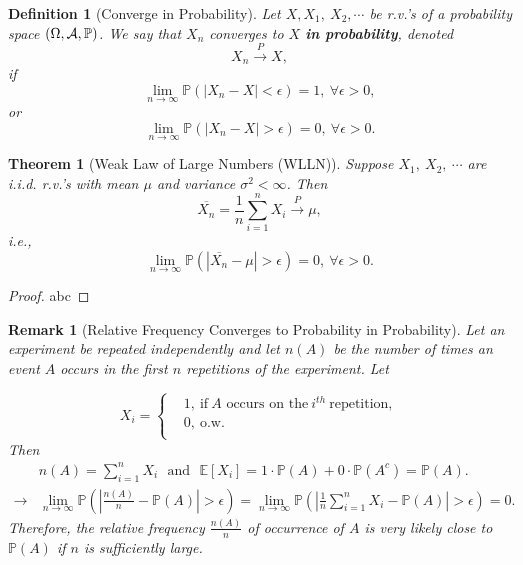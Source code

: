 \documentclass[openany,12pt]{book}
\newtheorem{theorem}{Theorem}[chapter]
\newtheorem{remark}{Remark}[chapter]
\newtheorem{definition}{Definition}[chapter]
\begin{document}
\begin{definition}[Converge in Probability]
Let $X,X_{1},\ X_{2},\cdots$ be r.v.'s of a probability space $(\Omega,\mathcal{A},\mathbb{P})$. We say that $X_{n}$ converges to $X$ \textbf{in probability}, denoted
\[X_{n}\xrightarrow{\ P\ }X,\]
if
\[\lim_{n \to \infty}{\mathbb{P}(\left| X_{n} - X \right| < \epsilon)} = 1,\ \forall\epsilon > 0,\]
or
\[\lim_{n \to \infty}{\mathbb{P}(\left| X_{n} - X \right| > \epsilon)} = 0,\ \forall\epsilon > 0.\]
\end{definition}

\begin{theorem}[Weak Law of Large Numbers (WLLN)]
Suppose $X_{1},\ X_{2},\ \cdots$ are i.i.d. r.v.'s with mean $\mu$ and variance $\sigma^{2} < \infty$. Then
\[\overline{X_{n}} = \frac{1}{n}\sum_{i = 1}^{n}X_{i}\xrightarrow{\ P\ }\mu,\]
i.e.,
\[ \lim_{n \to \infty}{\mathbb{P}\left( \left| \overline{X_{n}} - \mu \right| > \epsilon \right)} = 0,\ \forall\epsilon > 0.\]
\end{theorem}

\begin{proof}
  abc
\end{proof}

\begin{remark}[Relative Frequency Converges to Probability in Probability]
Let an experiment be repeated independently and let $n(A)$ be the
number of times an event $A$ occurs in the first $n$ repetitions of
the experiment. Let

\[X_{i} = \left\{ \begin{aligned}
&1,~\mathrm{\text{if}}\ A \mathrm{\text{\ occurs\ on\ the}}\ i^{th}\ \mathrm{\text{repetition}}, \\
&0,~\mathrm{\text{o.w.}} \\
\end{aligned} \right.\]
Then
\[\begin{aligned}
 &n(A) = \sum_{i = 1}^{n}X_{i}\text{\ \ }\mathrm{\text{and}}\text{\ \ }\mathbb{E}[X_{i}]= 1 \cdot \mathbb{P}(A) + 0 \cdot \mathbb{P}(A^{c}) = \mathbb{P}(A).\\
\to& \lim_{n \to \infty}{\mathbb{P}\left( \left| \frac{n(A)}{n} - \mathbb{P}(A) \right| > \epsilon \right)} = \lim_{n \to \infty}{\mathbb{P}\left( \left| \frac{1}{n}\sum_{i = 1}^{n}X_{i} - \mathbb{P}(A) \right| > \epsilon \right)} = 0.
\end{aligned}\]
Therefore, the relative frequency $\frac{n(A)}{n}$ of occurrence of $A$ is very likely close to $\mathbb{P}(A)$ if $n$ is sufficiently large.
\end{remark}
\end{document}
